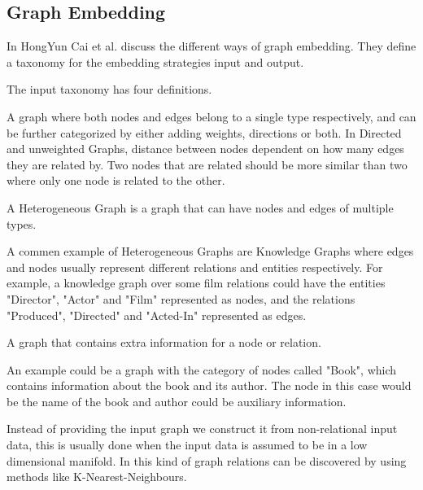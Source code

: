 \subsection{Graph Embedding}
In \cite{8294302} HongYun Cai et al. discuss the different ways of graph embedding. They define a taxonomy for the embedding strategies input and output.

The input taxonomy has four definitions.  

\begin{definition} A graph where both nodes and edges belong to a single type respectively, and can be further categorized by either adding weights, directions or both. In Directed and unweighted Graphs, distance between nodes dependent on how many edges they are related by. Two nodes that are related should be more similar than two where only one node is related to the other\cite{8294302}.
\end{definition}

\begin{definition} A Heterogeneous Graph is a graph that can have nodes and edges of multiple types\cite{8294302}. 
\end{definition}

A commen example of Heterogeneous Graphs are Knowledge Graphs where edges and nodes usually represent different relations and entities respectively. For example, a knowledge graph over some film relations could have the entities "Director", "Actor" and "Film" represented as nodes, and the relations "Produced", "Directed" and "Acted-In" represented as edges.

\begin{definition} A graph that contains extra information for a node or relation. 
\end{definition}

An example could be a graph with the category of nodes called "Book", which contains information about the book and its author. The node in this case would be the name of the book and author could be auxiliary information\cite{8294302}.

\begin{definition} Instead of providing the input graph we construct it from non-relational input data, this is usually done when the input data is assumed to be in a low dimensional manifold. In this kind of graph relations can be discovered by using methods like K-Nearest-Neighbours\cite{8294302}.
\end{definition}

